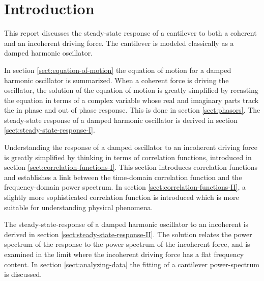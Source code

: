 

\renewcommand{\sect}[1]{\section{#1}}






\newcommand{\Real}[1]{\ensuremath{\mbox{Re}\{#1\}}}
\newcommand{\Imag}[1]{\ensuremath{\mbox{Im}\{#1\}}}
\newcommand{\xrms}[0]{\ensuremath{x_{\mbox{\tiny rms}}}}

\sect{Introduction}

This report discusses the steady-state response of a cantilever to
both a coherent and an incoherent driving force.  The cantilever is
modeled classically as a damped harmonic oscillator.

In section \ref{sect:equation-of-motion} the equation of motion for a
damped harmonic oscillator is summarized.  When a coherent force is
driving the oscillator, the solution of the equation of motion is
greatly simplified by recasting the equation in terms of a complex
variable whose real and imaginary parts track the in phase and out of
phase response.  This is done in section \ref{sect:phasors}.  The
steady-state response of a damped harmonic oscillator is derived in
section \ref{sect:steady-state-response-I}.

Understanding the response of a damped oscillator to an incoherent
driving force is greatly simplified by thinking in terms of correlation
functions, introduced in section \ref{sect:correlation-functions-I}.
This section introduces correlation functions and establishes a link
between the time-domain correlation function and the frequency-domain
power spectrum.  In section \ref{sect:correlation-functions-II}, a
slightly more sophisticated correlation function is introduced which
is more suitable for understanding physical phenomena.

The steady-state-response of a damped harmonic oscillator to an
incoherent is derived in section \ref{sect:steady-state-response-II}.
The solution relates the power spectrum of the response to the power
spectrum of the incoherent force, and is examined in the limit where
the incoherent driving force has a flat frequency content.  In section
\ref{sect:analyzing-data} the fitting of a cantilever power-spectrum
is discussed.

